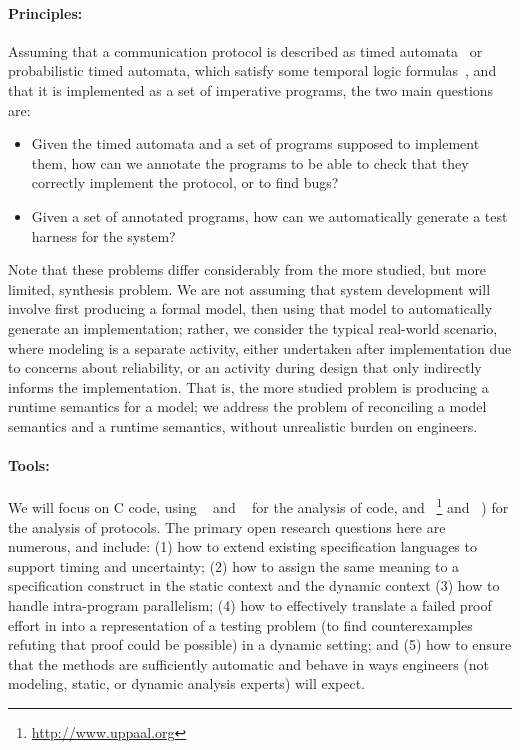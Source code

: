 \paragraph{Principles:} Assuming that a communication protocol is described
as timed automata~\cite{AD1994:TCS} or probabilistic timed automata,
which satisfy some temporal logic
formulas~\cite{BLM2017:LNCS}, and that it is implemented as a set of
imperative programs, the two main questions are:
\begin{itemize}
\item Given the timed automata and a set of programs supposed to
  implement them, how can we annotate the programs to be able to check
  that they correctly implement the protocol, or to find bugs?
\item Given a set of annotated programs, how can we automatically
  generate a test harness for the system?
\end{itemize}

Note that these problems differ considerably from the more studied,
but more limited, synthesis problem.  We are not assuming that
system development will involve first producing a formal model, then
using that model to automatically generate an implementation; rather,
we consider the typical real-world scenario, where modeling is a
separate activity, either undertaken after implementation due to
concerns about reliability, or an activity during design that only
indirectly informs the implementation.  That is, the more studied
problem is producing a runtime semantics for a model; we address the
problem of reconciling a model semantics and a runtime semantics,
without unrealistic burden on engineers.


\paragraph{Tools:} We will focus on C code, using \framac~\cite{KKP2015:FAC} and \deepstate~\cite{DeepState}
for the analysis of code, and
\uppaal~\footnote{\url{http://www.uppaal.org}} and
\prism~\cite{KNP2011:CAV}) for the analysis of protocols.  The primary open research questions here are numerous, and include:
(1) how to extend existing specification languages to support timing and uncertainty;
(2) how to assign the same meaning to a specification construct in
  the static \framac context and the dynamic \deepstate context
(3) how to handle intra-program parallelism;
(4) how to effectively translate a failed proof effort in \framac
  into a representation of a testing problem (to find counterexamples
  refuting that proof could be possible) in a dynamic setting; and
(5) how to ensure that the methods are sufficiently automatic
  and behave in ways engineers (not modeling, static, or dynamic
  analysis experts) will expect.

